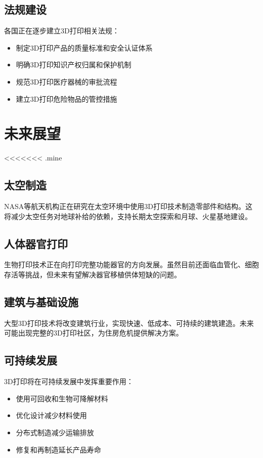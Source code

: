 \documentclass[12pt,UTF8]{ctexbook}
\begin{document}
\subsection{法规建设}
各国正在逐步建立3D打印相关法规：
\begin{itemize}
\item 制定3D打印产品的质量标准和安全认证体系
\item 明确3D打印知识产权归属和保护机制
\item 规范3D打印医疗器械的审批流程
\item 建立3D打印危险物品的管控措施
\end{itemize}

\section{未来展望}

<<<<<<< .mine
\subsection{太空制造}
NASA等航天机构正在研究在太空环境中使用3D打印技术制造零部件和结构。这将减少太空任务对地球补给的依赖，支持长期太空探索和月球、火星基地建设。

\subsection{人体器官打印}
生物打印技术正在向打印完整功能器官的方向发展。虽然目前还面临血管化、细胞存活等挑战，但未来有望解决器官移植供体短缺的问题。

\subsection{建筑与基础设施}
大型3D打印技术将改变建筑行业，实现快速、低成本、可持续的建筑建造。未来可能出现完整的3D打印社区，为住房危机提供解决方案。

\subsection{可持续发展}
3D打印将在可持续发展中发挥重要作用：
\begin{itemize}
\item 使用可回收和生物可降解材料
\item 优化设计减少材料使用
\item 分布式制造减少运输排放
\item 修复和再制造延长产品寿命
\end{itemize}
\end{document}
